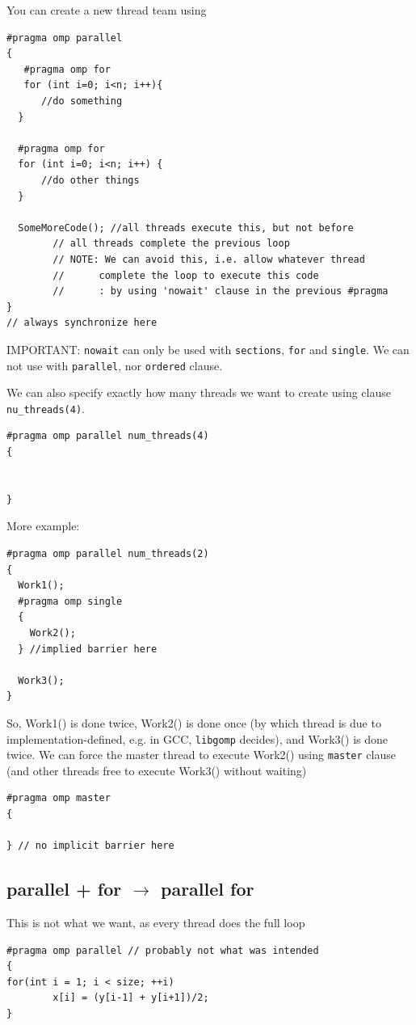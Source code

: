 You can create a new thread team using 
\begin{lstlisting}
#pragma omp parallel 
{
   #pragma omp for 
   for (int i=0; i<n; i++){
      //do something
  }
	
  #pragma omp for
  for (int i=0; i<n; i++) {
      //do other things
  }

  SomeMoreCode(); //all threads execute this, but not before 
        // all threads complete the previous loop
        // NOTE: We can avoid this, i.e. allow whatever thread
        //      complete the loop to execute this code
        //      : by using 'nowait' clause in the previous #pragma
}
// always synchronize here

\end{lstlisting}
IMPORTANT: \verb!nowait! can only be used with \verb!sections!, \verb!for! and
\verb!single!. We can not use with \verb!parallel!, nor \verb!ordered! clause.

We can also specify exactly how many threads we want to create using clause
\verb!nu_threads(4)!.

\begin{verbatim}
#pragma omp parallel num_threads(4)
{


}
\end{verbatim}


More example:
\begin{verbatim}
#pragma omp parallel num_threads(2)
{
  Work1();
  #pragma omp single
  {
  	Work2();
  } //implied barrier here
  
  Work3();
}
\end{verbatim}
So, Work1() is done twice, Work2() is done once (by which thread is due to
implementation-defined, e.g. in GCC, \verb!libgomp! decides), and Work3() is
done twice. We can force the master thread to execute Work2() using
\verb!master! clause (and other threads free to execute Work3() without waiting)
\begin{verbatim}
#pragma omp master
{

} // no implicit barrier here
\end{verbatim}



\subsection{parallel + for $\rightarrow$ parallel for}
\label{sec:directive_for}

This is not what we want, as every thread does the full loop
\begin{verbatim}
#pragma omp parallel // probably not what was intended
{
for(int i = 1; i < size; ++i)
        x[i] = (y[i-1] + y[i+1])/2;
}
\end{verbatim}

